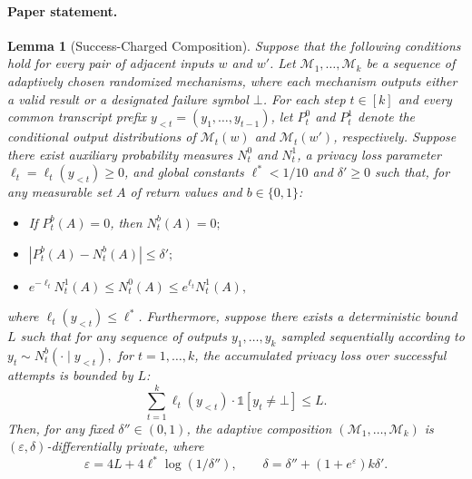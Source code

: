 \documentclass[a4paper,10pt]{article}
\newtheorem{lemma}[theorem]{Lemma}
\theoremstyle{definition}
\theoremstyle{remark}
\newcommand{\eps}{\varepsilon}
\newcommand{\del}{\delta}
\newcommand{\ind}{\mathbb{1}}
\newcommand{\bottom}{\bot}
\begin{document}
\paragraph{Paper statement.}
\setcounter{theorem}{15}
\begin{lemma}[Success-Charged Composition]
\label{lem:pay-what-you-get}
Suppose that the following conditions hold for every pair of adjacent inputs $w$ and $w'$. Let $\mathcal{M}_1, \dots, \mathcal{M}_k$ be a sequence of adaptively chosen randomized mechanisms, where each mechanism outputs either a valid result or a designated failure symbol $\bottom$.
For each step $t \in [k]$ and every common transcript prefix $y_{<t} = (y_1, \dots, y_{t-1})$, let $P_t^0$ and $P_t^1$ denote the conditional output distributions of $\mathcal{M}_t(w)$ and $\mathcal{M}_t(w')$, respectively. Suppose there exist auxiliary probability measures $N_t^0$ and $N_t^1$, a privacy loss parameter $\ell_t = \ell_t(y_{<t}) \ge 0$, and global constants $\ell^* < 1/10$ and $\delta' \ge 0$ such that, for any measurable set $A$ of return values and $b \in \{0, 1\}$:
\begin{itemize}
    \item If $P_t^b(A)=0$, then $N_t^b(A)=0;$
    \item $|P_t^b(A) - N_t^b(A)| \le \delta';$
    \item $e^{-\ell_t} N_t^1(A) \le N_t^0(A) \le e^{\ell_t} N_t^1(A),$
\end{itemize}
where $\ell_t(y_{<t}) \le \ell^*$.
Furthermore, suppose there exists a deterministic bound  $L$
such that for any sequence of outputs $y_1, \dots, y_k$ sampled sequentially according to
$y_t\sim N_t^b(\cdot\mid y_{<t}),$ for $t=1,\ldots,k$,
the accumulated privacy loss over successful attempts is bounded by $L$:
\begin{equation*}
    \sum_{t=1}^k \ell_t(y_{<t}) \cdot \ind[y_t \ne \bottom] \le L.
\end{equation*}
Then, for any fixed $\delta'' \in (0,1)$, the adaptive composition $(\mathcal{M}_1, \dots, \mathcal{M}_k)$ is $(\eps, \del)$-differentially private, where
\begin{equation*}
    \eps = 4L + 4\ell^*\log(1/\del''), \qquad \del = \del'' + (1+e^{\eps})k\del'.
\end{equation*}
\end{lemma}
\end{document}
